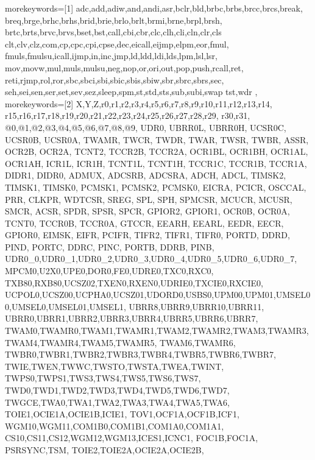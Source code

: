 
% 


{
	morekeywords=[1]
	{
	adc,add,adiw,and,andi,asr,bclr,bld,brbc,brbs,brcc,brcs,break,
		breq,brge,brhc,brhs,brid,brie,brlo,brlt,brmi,brne,brpl,brsh,
		brtc,brts,brvc,brvs,bset,bst,call,cbi,cbr,clc,clh,cli,cln,clr,cls
		clt,clv,clz,com,cp,cpc,cpi,cpse,dec,eicall,eijmp,elpm,eor,fmul,
		fmuls,fmulsu,icall,ijmp,in,inc,jmp,ld,ldd,ldi,lds,lpm,lsl,lsr,
		mov,movw,mul,muls,mulsu,neg,nop,or,ori,out,pop,push,rcall,ret,
		reti,rjmp,rol,ror,sbc,sbci,sbi,sbic,sbis,sbiw,sbr,sbrc,sbrs,sec,
		seh,sei,sen,ser,set,sev,sez,sleep,spm,st,std,sts,sub,subi,swap
		tst,wdr
	},
	morekeywords=[2]
	{
		X,Y,Z,r0,r1,r2,r3,r4,r5,r6,r7,r8,r9,r10,r11,r12,r13,r14,
		r15,r16,r17,r18,r19,r20,r21,r22,r23,r24,r25,r26,r27,r28,r29,
		r30,r31,
		@0,@1,@2,@3,@4,@5,@6,@7,@8,@9,
		UDR0, UBRR0L, UBRR0H, UCSR0C, UCSR0B, UCSR0A, TWAMR, TWCR, TWDR,
		TWAR, TWSR, TWBR, ASSR, OCR2B, OCR2A, TCNT2, TCCR2B, TCCR2A, OCR1BL,
		OCR1BH, OCR1AL, OCR1AH, ICR1L, ICR1H, TCNT1L, TCNT1H, TCCR1C, TCCR1B,
		TCCR1A, DIDR1, DIDR0, ADMUX, ADCSRB, ADCSRA, ADCH, ADCL, TIMSK2,
		TIMSK1, TIMSK0, PCMSK1, PCMSK2, PCMSK0, EICRA, PCICR, OSCCAL, PRR,
		CLKPR, WDTCSR, SREG, SPL, SPH, SPMCSR, MCUCR, MCUSR, SMCR, ACSR, 
		SPDR, SPSR, SPCR, GPIOR2, GPIOR1, OCR0B, OCR0A, TCNT0, TCCR0B, TCCR0A,
		GTCCR, EEARH, EEARL, EEDR, EECR, GPIOR0, EIMSK, EIFR, PCIFR, TIFR2,
		TIFR1, TIFR0, PORTD, DDRD, PIND, PORTC, DDRC, PINC, PORTB, DDRB, PINB,
		UDR0_0,UDR0_1,UDR0_2,UDR0_3,UDR0_4,UDR0_5,UDR0_6,UDR0_7,
		MPCM0,U2X0,UPE0,DOR0,FE0,UDRE0,TXC0,RXC0,
		TXB80,RXB80,UCSZ02,TXEN0,RXEN0,UDRIE0,TXCIE0,RXCIE0,
		UCPOL0,UCSZ00,UCPHA0,UCSZ01,UDORD0,USBS0,UPM00,UPM01,UMSEL00,UMSEL0,UMSEL01,UMSEL1,
		UBRR8,UBRR9,UBRR10,UBRR11,
		UBRR0,UBRR1,UBRR2,UBRR3,UBRR4,UBRR5,UBRR6,UBRR7,
		TWAM0,TWAMR0,TWAM1,TWAMR1,TWAM2,TWAMR2,TWAM3,TWAMR3,TWAM4,TWAMR4,TWAM5,TWAMR5,
		TWAM6,TWAMR6,
		TWBR0,TWBR1,TWBR2,TWBR3,TWBR4,TWBR5,TWBR6,TWBR7,
		TWIE,TWEN,TWWC,TWSTO,TWSTA,TWEA,TWINT,
		TWPS0,TWPS1,TWS3,TWS4,TWS5,TWS6,TWS7,
		TWD0,TWD1,TWD2,TWD3,TWD4,TWD5,TWD6,TWD7,
		TWGCE,TWA0,TWA1,TWA2,TWA3,TWA4,TWA5,TWA6,
		TOIE1,OCIE1A,OCIE1B,ICIE1,
		TOV1,OCF1A,OCF1B,ICF1,
		WGM10,WGM11,COM1B0,COM1B1,COM1A0,COM1A1,
		CS10,CS11,CS12,WGM12,WGM13,ICES1,ICNC1,
		FOC1B,FOC1A,
		PSRSYNC,TSM,
		TOIE2,TOIE2A,OCIE2A,OCIE2B,
}}
